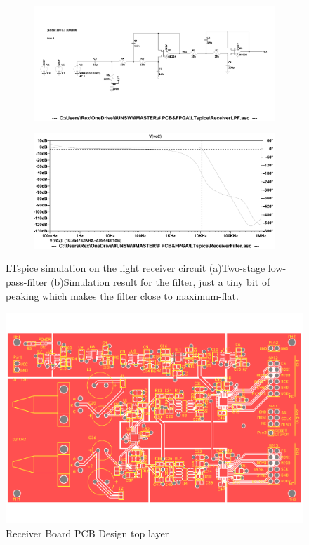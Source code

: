 \begin{figure}[H]
\centering
\begin{subfigure}{1\textwidth}
  \centering
  \includegraphics[width=1\linewidth]{4-ANC_Sys/LTspiceLPFSch.pdf}
  \caption{}
  \label{fig_LTspiceLPFSch}
\end{subfigure}
\begin{subfigure}{1\textwidth}
  \centering
  \includegraphics[width=1\linewidth]{4-ANC_Sys/LTspiceLPF.pdf}
  \caption{}
  \label{fig_LTspiceLPF}
\end{subfigure}
\caption{LTspice simulation on the light receiver circuit (a)Two-stage low-pass-filter (b)Simulation result for the filter, just a tiny bit of peaking which makes the filter close to maximum-flat.}
\label{fig_LTspiceSim2}
\end{figure}

\begin{figure}[H]
\centering
\includegraphics[width=0.9\linewidth]{4-ANC_Sys/PCB.pdf}
\caption{Receiver Board PCB Design top layer}
\label{fig_PCB}
\end{figure}

